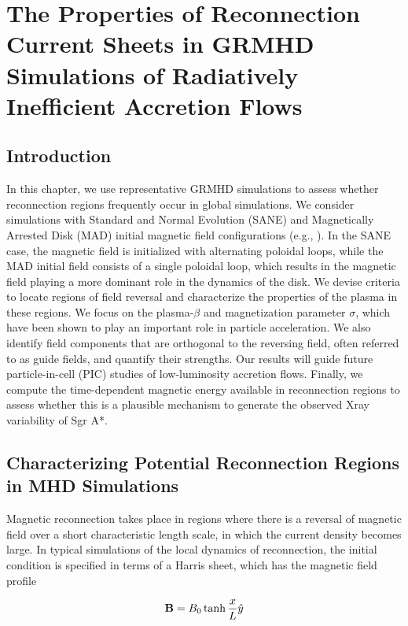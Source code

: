 \chapter[The Properties of Reconnection Current Sheets in GRMHD Simulations of Radiatively Inefficient Accretion Flows]
{The Properties of Reconnection Current Sheets in GRMHD Simulations of Radiatively Inefficient Accretion Flows}

\section{Introduction}
In this chapter, we use representative GRMHD simulations to assess whether reconnection regions frequently
occur in global simulations. We consider simulations
with Standard and Normal Evolution (SANE) and Magnetically Arrested Disk (MAD) initial magnetic field configurations (e.g., \citealt{narayan2012}). In the SANE case, the magnetic field is initialized with alternating poloidal loops, while the MAD initial field consists of a single poloidal loop, which results
in the magnetic field playing a more dominant role in
the dynamics of the disk. We devise criteria to locate
regions of field reversal and characterize the properties
of the plasma in these regions. We focus on the plasma-$\beta$
and magnetization parameter $\sigma$, which have been shown
to play an important role in particle acceleration. We
also identify field components that are orthogonal to
the reversing field, often referred to as guide fields, and
quantify their strengths. Our results will guide future
particle-in-cell (PIC) studies of low-luminosity accretion
flows. Finally, we compute the time-dependent magnetic
energy available in reconnection regions to assess whether
this is a plausible mechanism to generate the observed Xray variability of Sgr A*.

\section{Characterizing Potential Reconnection Regions in MHD Simulations}
Magnetic reconnection takes place in regions where
there is a reversal of magnetic field over a short characteristic length scale, in which the current density becomes large. In typical simulations of the local dynamics
of reconnection, the initial condition is specified in terms
of a Harris sheet, which has the magnetic field profile

\begin{equation}
	\bold{B} = B_0 \tanh{\frac{x}{L}}\hat{y}
\end{equation}

